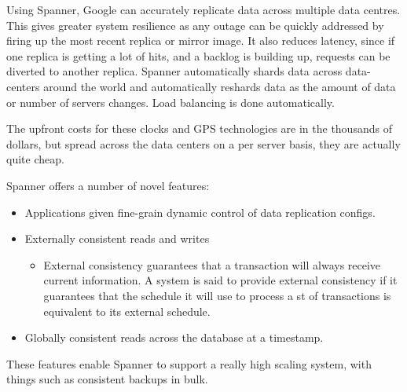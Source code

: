 \documentclass[11pt,a4paper,titlepage,dvipsnames,cmyk]{scrartcl}
\begin{document}
Using Spanner, Google can accurately replicate data across multiple data centres. This gives greater system resilience as any outage can be quickly addressed by firing up the most recent replica or mirror image. It also reduces latency, since if one replica is getting a lot of hits, and a backlog is building up, requests can be diverted to another replica. Spanner automatically shards data across data-centers around the world and automatically reshards data as the amount of data or number of servers changes. Load balancing is done automatically.

The upfront costs for these clocks and GPS technologies are in the thousands of dollars, but spread across the data centers on a per server basis, they are actually quite cheap.

Spanner offers a number of novel features:
\begin{itemize}
    \item Applications given fine-grain dynamic control of data replication configs.
    \item Externally consistent reads and writes
    \begin{itemize}
        \item External consistency guarantees that a transaction will always receive current information. A system is said to provide external consistency if it guarantees that the schedule it will use to process a st of transactions is equivalent to its external schedule.
    \end{itemize}
    \item Globally consistent reads across the database at a timestamp.
\end{itemize}

These features enable Spanner to support a really high scaling system, with things such as consistent backups in bulk.
\end{document}
